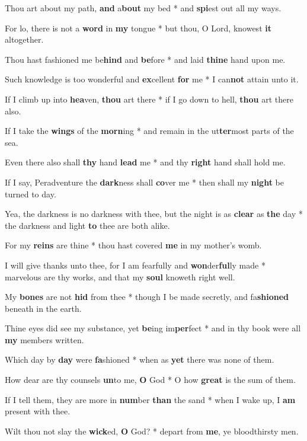\begin{multicols}{2}
	Thou art about my path, \textbf{and} a\textbf{bout} my bed * and \textbf{spi}est out all my ways.
	
	For lo, there is not a \textbf{word} in \textbf{my} tongue * but thou, O Lord, knowest \textbf{it} altogether.
	
	Thou hast fashioned me be\textbf{hind} and \textbf{be}fore * and laid \textbf{thine} hand upon me.
	
	Such knowledge is too wonderful and \textbf{ex}cellent \textbf{for} me * I can\textbf{not} attain unto it.
	
	If I climb up into \textbf{hea}ven, \textbf{thou} art there * if I go down to hell, \textbf{thou} art there also.
	
	If I take the \textbf{wings} of the \textbf{morn}ing * and remain in the ut\textbf{ter}most parts of the sea.
	
	Even there also shall \textbf{thy} hand \textbf{lead} me * and thy \textbf{right} hand shall hold me.
	
	If I say, Peradventure the \textbf{dark}ness shall \textbf{co}ver me * then shall my \textbf{night} be turned to day.
	
	Yea, the darkness is no darkness with thee, but the night is as \textbf{clear} as \textbf{the} day * the darkness and light \textbf{to} thee are both alike.
	
	For my \textbf{reins} are thine * thou hast covered \textbf{me} in my mother's womb.
	
	I will give thanks unto thee, for I am fearfully and \textbf{won}der\textbf{ful}ly made * marvelous are thy works, and that my \textbf{soul} knoweth right well.
	
	My \textbf{bones} are not \textbf{hid} from thee * though I be made secretly, and fa\textbf{shioned} beneath in the earth.
	
	Thine eyes did see my substance, yet \textbf{be}ing im\textbf{per}fect * and in thy book were all \textbf{my} members written.
	
	Which day by \textbf{day} were \textbf{fa}shioned * when as \textbf{yet} there was none of them.
	
	How dear are thy counsels \textbf{un}to me, \textbf{O} God * O how \textbf{great} is the sum of them.
	
	If I tell them, they are more in \textbf{num}ber \textbf{than} the sand * when I wake up, I \textbf{am} present with thee.
	
	Wilt thou not slay the \textbf{wick}ed, \textbf{O} God? * depart from \textbf{me}, ye bloodthirsty men.
	

\end{multicols}
